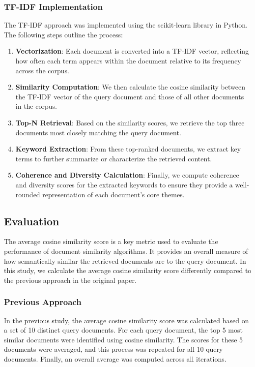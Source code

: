 \documentclass[12pt]{article}
\begin{document}
\subsubsection{TF-IDF Implementation}

The TF-IDF approach was implemented using the scikit-learn library in Python. The following steps outline the process:

\begin{enumerate}
    \item \textbf{Vectorization}: Each document is converted into a TF-IDF vector, reflecting how often each term appears within the document relative to its frequency across the corpus.
    \item \textbf{Similarity Computation}: We then calculate the cosine similarity between the TF-IDF vector of the query document and those of all other documents in the corpus.
    \item \textbf{Top-N Retrieval}: Based on the similarity scores, we retrieve the top three documents most closely matching the query document.
    \item \textbf{Keyword Extraction}: From these top-ranked documents, we extract key terms to further summarize or characterize the retrieved content.
    \item \textbf{Coherence and Diversity Calculation}: Finally, we compute coherence and diversity scores for the extracted keywords to ensure they provide a well-rounded representation of each document’s core themes.
\end{enumerate}


\subsection{Evaluation}

The average cosine similarity score is a key metric used to evaluate the performance of document similarity algorithms. It provides an overall measure of how semantically similar the retrieved documents are to the query document. In this study, we calculate the average cosine similarity score differently compared to the previous approach in the original paper.

\subsubsection{Previous Approach}

In the previous study, the average cosine similarity score was calculated based on a set of 10 distinct query documents. For each query document, the top 5 most similar documents were identified using cosine similarity. The scores for these 5 documents were averaged, and this process was repeated for all 10 query documents. Finally, an overall average was computed across all iterations.
\end{document}
